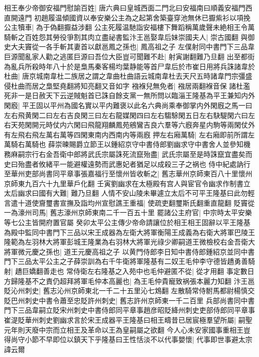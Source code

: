 相王奉少帝御安福門慰諭百姓|{
	唐六典曰皇城西面二門北曰安福南曰順義安福門西直開遠門}
初趙履温傾國資以奉安樂公主為之起第舍築臺穿池無休已擫紫衫以項挽公主犢車|{
	為于偽翻擫益涉翻}
公主死履温馳詣安福樓下舞蹈稱萬歲聲未絶相王令萬騎斬之百姓怨其勞役爭割其肉立盡祕書監汴王邕娶韋后妹崇國夫人|{
	崇古國翻}
與御史大夫竇從一各手斬其妻首以獻邕鳳之孫也|{
	鳳高祖之子}
左僕射同中書門下三品韋巨源聞亂家人勸之逃匿巨源曰吾位大臣豈可聞難不赴|{
	射寅謝翻難乃旦翻}
出至都街為亂兵所殺時年八十於是梟馬秦客楊均葉静能等首尸韋后於市崔日用將兵誅諸韋於杜曲|{
	唐京城南韋杜二族居之謂之韋曲杜曲語云城南韋杜去天尺五時諸韋門宗彊盛侵杜曲而居之梟堅堯翻將知亮翻又音如字}
襁褓兒無免者|{
	襁居兩翻褓音保}
諸杜濫死非一是日赦天下云逆賊魁首已誅自餘支黨一無所問以臨淄王隆基為平王兼知内外閑廏|{
	平王固以平州為國名實以平内難褒以此名六典尚乘奉御掌内外閑廐之馬一曰左右飛黄閑二曰左右吉良閑三曰左右龍媒閑四曰左右騶駼閑五日左右駃騠閑六曰左右天苑閑開元時仗内六閑曰飛龍翔麟鳳苑鵷鸞吉良六羣等六廐奔星内駒等兩閑仗外有左飛右飛左萬右萬等四閑東南内西南内等兩廐}
押左右廂萬騎|{
	左右廂即前所謂左萬騎右萬騎也}
薛崇暕賜爵立節王以鍾紹京守中書侍郎劉幽求守中書舍人並參知機務麻嗣宗行右金吾衛中郎將武氏宗屬誅死流竄殆盡|{
	武氏宗屬至是時誅竄宜盡矣而史曰殆盡者攸緒平一能避權遠勢而武惠妃者猶足以成殺三子之祸也}
侍中紀處訥行至華州吏部尚書同平章事張嘉福行至懷州皆收斬之|{
	舊志華州京師東百八十里懷州京師東九百六十九里華戶化翻}
壬寅劉幽求在太極殿有宫人與宦官令幽求作制書立太后幽求曰國有大難|{
	難乃旦翻}
人情不安山陵未畢遽立太后不可平王隆基曰此勿輕言遣十道使齎璽書宣撫及詣均州宣慰譙王重福|{
	使疏吏翻璽斯氏翻重直龍翻}
貶竇從一為濠州司馬|{
	舊志濠州京師東南二千一百五十里}
罷諸公主府官|{
	中宗時太平安樂等七公主皆開府置官屬}
癸卯太平公主傳少帝命請讓位於相王相王固辭以平王隆基為殿中監同中書門下三品以宋王成器為左衛大將軍衡陽王成義為右衛大將軍巴陵王隆範為左羽林大將軍彭城王隆業為右羽林大將軍光祿少卿嗣道王微檢校右金吾衛大將軍微元慶之孫也|{
	道王元慶高祖之子}
以黄門侍郎李日知中書侍郎鍾紹京並同中書門下三品太平公主之子薛崇訓為右千牛衛將軍隆基有二奴王毛仲李守德皆趫勇善騎射|{
	趫巨嬌翻善走也}
常侍衛左右隆基之入苑中也毛仲避匿不從|{
	從才用翻}
事定數日方歸隆基不之責仍超拜將軍毛仲本高麗也|{
	為王毛仲貴寵致祸張本麗力知翻}
汴王邕貶沁州刺史|{
	舊志沁州京師東北一千二十五里沁七鴆翻}
左散騎常侍駙馬都尉楊慎交貶巴州刺史中書令蕭至忠貶許州刺史|{
	舊志許州京師東一千二百里}
兵部尚書同中書門下三品韋嗣立貶宋州刺史中書侍郎同平章事趙彦昭貶絳州刺史吏部侍郎同平章事崔湜貶華州刺史劉幽求言於宋王成器平王隆基曰相王疇昔已居宸極羣望所屬|{
	嗣聖元年則天廢中宗而立相王及革命以王為皇嗣屬之欲翻}
今人心未安家國事重相王豈得尚守小節不早即位以鎮天下乎隆基曰王性恬淡不以代事嬰懷|{
	代事即世事避太宗諱云爾}
